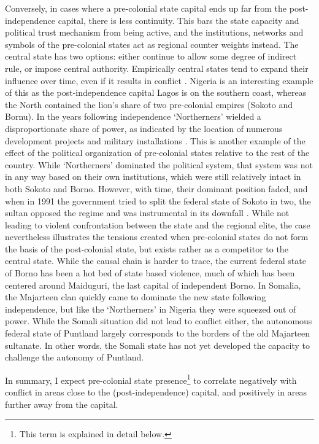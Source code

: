 \documentclass[12pt]{article}
\begin{document}
Conversely, in cases where a pre-colonial state capital ends up far from the
post-independence capital, there is less continuity. This bars the state
capacity and political trust mechanism from being active, and the institutions,
networks and symbols of the pre-colonial states act as regional counter weights
instead. The central state has two options: either continue to allow some degree
of indirect rule, or impose central authority. Empirically central states tend
to expand their influence over time, even if it results in conflict
\citep{Ying_2020}. Nigeria is an interesting example of this as the
post-independence capital Lagos is on the southern coast, whereas the North
contained the lion's share of two pre-colonial empires (Sokoto and Bornu). In
the years following independence `Northerners' wielded a disproportionate share
of power, as indicated by the location of numerous development projects and
military installations \citep{Bates2008a}. This is another example of the effect
of the political organization of pre-colonial states relative to the rest of the
country. While `Northerners' dominated the political system, that system was not
in any way based on their own institutions, which were still relatively intact
in both Sokoto and Borno. However, with time, their dominant position faded, and
when in 1991 the government tried to split the federal state of Sokoto in two,
the sultan opposed the regime and was instrumental in its downfall
\citep{HiribarrenVincent2017AHoB}. While not leading to violent confrontation
between the state and the regional elite, the case nevertheless illustrates the
tensions created when pre-colonial states do not form the basis of the
post-colonial state, but exists rather as a competitor to the central state.
While the causal chain is harder to trace, the current federal state of Borno
has been a hot bed of state based violence, much of which has been centered
around Maiduguri, the last capital of independent Borno. In Somalia, the
Majarteen clan quickly came to dominate the new state following independence, but
like the `Northerners' in Nigeria they were squeezed out of power. While the
Somali situation did not lead to conflict either, the autonomous federal state
of Puntland largely corresponds to the borders of the old Majarteen sultanate.
In other words, the Somali state has not yet developed the capacity to challenge
the autonomy of Puntland. %

In summary, I expect pre-colonial state presence\footnote{This term is explained
in detail below.} to correlate negatively with conflict in areas close to the
(post-independence) capital, and positively in areas further away from the
capital.
\end{document}
